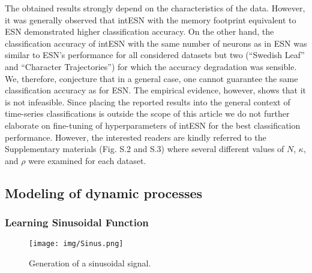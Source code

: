 The obtained results strongly depend on the characteristics of the data. However, it was generally observed that intESN with the memory footprint equivalent to ESN demonstrated higher classification accuracy. 
On the other hand, the classification accuracy of intESN with the same number of neurons as in ESN was similar to ESN's performance for all considered datasets but two (``Swedish Leaf'' and ``Character Trajectories'') for which the accuracy degradation was sensible.
We, therefore, conjecture that in a general case, one cannot guarantee the same classification accuracy as for
ESN. The empirical evidence, however, shows that it is not infeasible. Since placing the reported results into
the general context of time-series classifications is outside the scope of this article we do not further
elaborate on fine-tuning of hyperparameters of intESN for the best classification performance.
However, the interested readers are kindly referred to the Supplementary materials (Fig. S.2 and S.3) where several different values of $N$, $\kappa$, and $\rho$ were examined for each dataset. 







\subsection{Modeling of dynamic processes}
\subsubsection{Learning Sinusoidal Function}


\begin{figure}[tb]%
\centering
\texttt{[image: img/Sinus.png]}
\caption{Generation of a sinusoidal signal.}
\label{fig:Sinus}
\end{figure}

